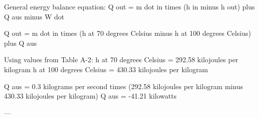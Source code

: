 General energy balance equation:  
Q out = m dot in times (h in minus h out) plus Q aus minus W dot  

Q out = m dot in times (h at 70 degrees Celsius minus h at 100 degrees Celsius) plus Q aus  

Using values from Table A-2:  
h at 70 degrees Celsius = 292.58 kilojoules per kilogram  
h at 100 degrees Celsius = 430.33 kilojoules per kilogram  

Q aus = 0.3 kilograms per second times (292.58 kilojoules per kilogram minus 430.33 kilojoules per kilogram)  
Q aus = -41.21 kilowatts  

---